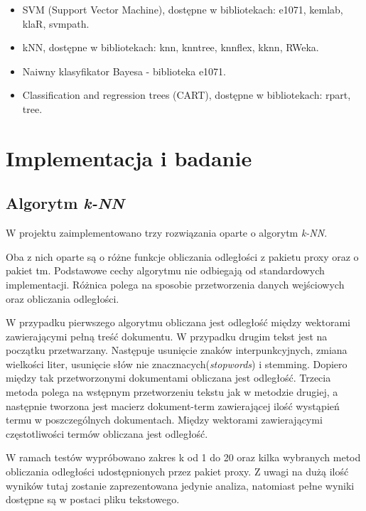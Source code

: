 \documentclass[a4paper,12pt]{article}
\begin{document}
  \begin{itemize}
  \item SVM (Support Vector Machine), dostępne w bibliotekach: e1071, kemlab, klaR, svmpath.
  \item kNN, dostępne w bibliotekach: knn, knntree, knnflex, kknn, RWeka.
  \item Naiwny klasyfikator Bayesa - biblioteka e1071.
  \item Classification and regression trees (CART), dostępne w bibliotekach: rpart, tree.
  \end{itemize}


\section{Implementacja i badanie}
\subsection{Algorytm \textit{k-NN}}
W projektu zaimplementowano trzy rozwiązania oparte o algorytm \textit{k-NN}.

Oba z nich oparte są o różne funkcje obliczania odległości z pakietu proxy oraz o pakiet tm. Podstawowe cechy algorytmu nie odbiegają od standardowych implementacji. Różnica polega na sposobie przetworzenia danych wejściowych oraz obliczania odległości. 

W przypadku pierwszego algorytmu obliczana jest odległość między wektorami zawierającymi pełną treść dokumentu. W przypadku drugim tekst jest na początku przetwarzany. Następuje usunięcie znaków interpunkcyjnych, zmiana wielkości liter, usunięcie słów nie znacznacych(\textit{stopwords}) i stemming. Dopiero między tak przetworzonymi dokumentami obliczana jest odległość. Trzecia metoda polega na wstępnym przetworzeniu tekstu jak w metodzie drugiej, a następnie tworzona jest macierz dokument-term zawierającej ilość wystąpień termu w poszczególnych dokumentach. Między wektorami zawierającymi częstotliwości termów obliczana jest odległość.

W ramach testów wypróbowano zakres k od 1 do 20 oraz kilka wybranych metod obliczania odległości udostępnionych przez pakiet proxy. Z uwagi na dużą ilość wyników tutaj zostanie zaprezentowana jedynie analiza, natomiast pełne wyniki dostępne są w postaci pliku tekstowego.
\end{document}
